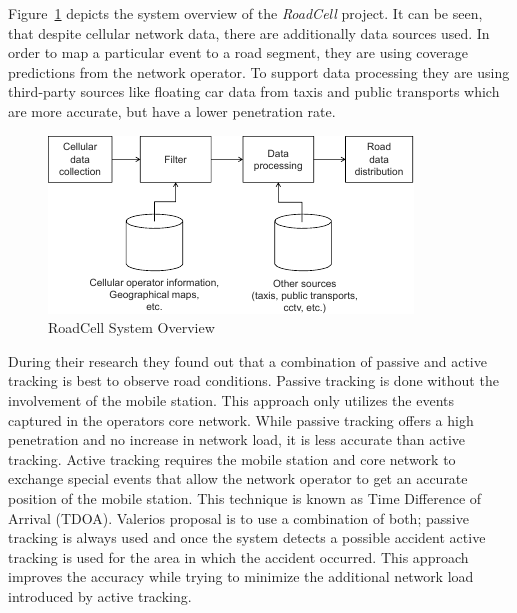 \documentclass[master,english]{hgbthesis}
\begin{document}
Figure~\ref{fig:roadcell} depicts the system overview of the \emph{RoadCell} project. It can be seen, that despite cellular network data, there are additionally data sources used. In order to map a particular event to a road segment, they are using coverage predictions from the network operator. To support data processing they are using third-party sources like floating car data from taxis and public transports which are more accurate, but have a lower penetration rate.
\begin{figure}
\centering
\includegraphics[width=0.7\linewidth]{./images/roadcell}
\caption{RoadCell System Overview \cite{Valerio2009}}
\label{fig:roadcell}
\end{figure}
During their research they found out that a combination of passive and active tracking is best to observe road conditions. Passive tracking is done without the involvement of the mobile station. This approach only utilizes the events captured in the operators core network. While passive tracking offers a high penetration and no increase in network load, it is less accurate than active tracking. Active tracking requires the mobile station and core network to exchange special events that allow the network operator to get an accurate position of the mobile station. This technique is known as Time Difference of Arrival (TDOA). Valerios proposal is to use a combination of both; passive tracking is always used and once the system detects a possible accident active tracking is used for the area in which the accident occurred. This approach improves the accuracy while trying to minimize the additional network load introduced by active tracking.
\end{document}
